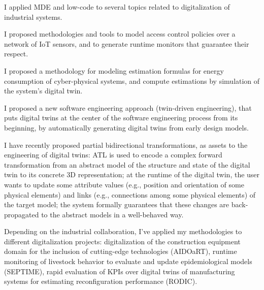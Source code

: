 \documentclass[10pt,a4paper]{article}
\begin{document}
I applied MDE and low-code to several topics related to digitalization of industrial systems. 

I proposed methodologies and tools to model access control policies over a network of IoT sensors, and to generate runtime monitors that guarantee their respect.

I proposed a methodology for modeling  estimation formulas for energy consumption of cyber-physical systems, and compute estimations by simulation of the system's digital twin. 

I proposed a new software engineering approach (twin-driven engineering), that puts digital twins at the center of the software engineering process from its beginning, by automatically generating digital twins from early design models.

I have recently proposed partial bidirectional transformations, as assets to the engineering of digital twins: ATL is used to encode a complex forward transformation from an abstract model of the structure and state of the digital twin to its concrete 3D representation; at the runtime of the digital twin, the user wants to update some attribute values (e.g., position and orientation of some physical elements) and links (e.g., connections among some physical elements) of the target model; the system formally guarantees that these changes are back-propagated to the abstract models in a well-behaved way. 

Depending on the industrial collaboration, I've applied my methodologies to different digitalization projects: digitalization of the construction equipment domain  for the inclusion of cutting-edge technologies
(AIDOaRT), runtime monitoring of livestock behavior to evaluate and update epidemiological models  (SEPTIME), rapid evaluation of KPIs over digital twins of manufacturing systems for estimating reconfiguration performance (RODIC).

\end{document}
